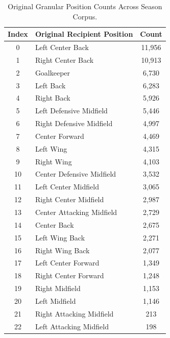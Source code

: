 \documentclass[12pt, a4paper]{article}
\begin{document}
\begin{table}[htbp]
    \centering
    \small
    \caption{Original Granular Position Counts Across Season Corpus.}
    \label{tab:original_position_counts}
    \begin{tabularx}{0.75\textwidth}{c X c}
        \toprule
        \textbf{Index} & \textbf{Original Recipient Position} & \textbf{Count} \\
        \midrule
        0  & Left Center Back & 11,956 \\
        1  & Right Center Back & 10,913 \\
        2  & Goalkeeper & 6,730 \\
        3  & Left Back & 6,283 \\
        4  & Right Back & 5,926 \\
        5  & Left Defensive Midfield & 5,446 \\
        6  & Right Defensive Midfield & 4,997 \\
        7  & Center Forward & 4,469 \\
        8  & Left Wing & 4,315 \\
        9  & Right Wing & 4,103 \\
        10 & Center Defensive Midfield & 3,532 \\
        11 & Left Center Midfield & 3,065 \\
        12 & Right Center Midfield & 2,987 \\
        13 & Center Attacking Midfield & 2,729 \\
        14 & Center Back & 2,675 \\
        15 & Left Wing Back & 2,271 \\
        16 & Right Wing Back & 2,077 \\
        17 & Left Center Forward & 1,349 \\
        18 & Right Center Forward & 1,248 \\
        19 & Right Midfield & 1,153 \\
        20 & Left Midfield & 1,146 \\
        21 & Right Attacking Midfield & 213 \\
        22 & Left Attacking Midfield & 198 \\
        \bottomrule
    \end{tabularx}
\end{table}

\clearpage
\end{document}

